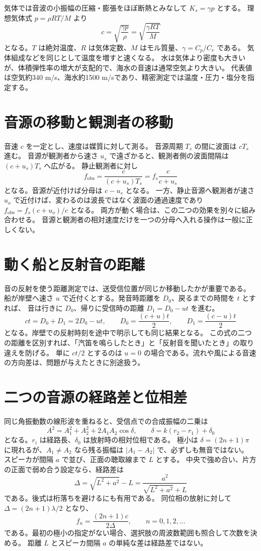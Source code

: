 気体では音波の小振幅の圧縮・膨張をほぼ断熱とみなして \(K_s=\gamma p\) とする。
理想気体式 \(p=\rho RT/M\) より
\[
 c=\sqrt{\frac{\gamma p}{\rho}}=\sqrt{\frac{\gamma RT}{M}}
\]
となる。\(T\) は絶対温度、\(R\) は気体定数、\(M\) はモル質量、\(\gamma=C_p/C_v\) である。
気体組成などを同じとして温度を増すと速くなる。
水は気体より密度も大きいが、体積弾性率の増大が支配的で、海水の音速は通常空気より大きい。
代表値は空気約340 m/s、海水約1500 m/sであり、精密測定では温度・圧力・塩分を指定する\cite{os_sound}。

\section{音源の移動と観測者の移動}\label{theory:wave:doppler}
音速 \(c\) を一定とし、速度は媒質に対して測る。
音源周期 \(T_s\) の間に波面は \(cT_s\) 進む。
音源が観測者から速さ \(u_s\) で遠ざかると、観測者側の波面間隔は \((c+u_s)T_s\) へ広がる。
静止観測者に対し
\[
 f_{\mathrm{obs}}=\frac{c}{(c+u_s)T_s}=f_s\frac{c}{c+u_s}
\]
となる。音源が近付けば分母は \(c-u_s\) となる。
一方、静止音源へ観測者が速さ \(u_o\) で近付けば、変わるのは波長ではなく波面の通過速度であり
\(f_{\mathrm{obs}}=f_s(c+u_o)/c\) となる。
両方が動く場合は、この二つの効果を別々に組み合わせる\cite{os_doppler}。
音源と観測者の相対速度だけを一つの分母へ入れる操作は一般に正しくない。

\section{動く船と反射音の距離}\label{theory:wave:echo}
音の反射を使う距離測定では、送受信位置が同じか移動したかが重要である。
船が岸壁へ速さ \(u\) で近付くとする。発音時距離を \(D_0\)、戻るまでの時間を \(t\) とすれば、
音は行きに \(D_0\)、帰りに受信時の距離 \(D_1=D_0-ut\) を進む。
\[
 ct=D_0+D_1=2D_0-ut,\qquad
 D_0=\frac{(c+u)t}{2},\qquad D_1=\frac{(c-u)t}{2}
\]
となる。岸壁での反射時刻を途中で明示しても同じ結果となる。
この式の二つの距離を区別すれば、「汽笛を鳴らしたとき」と「反射音を聞いたとき」の取り違えを防げる。
単に \(ct/2\) とするのは \(u=0\) の場合である。流れや風による音速の方向差は、問題が与えたときに別途扱う。

\section{二つの音源の経路差と位相差}\label{theory:wave:interference}
同じ角振動数の線形波を重ねると、受信点での合成振幅の二乗は
\[
 A^2=A_1^2+A_2^2+2A_1A_2\cos\delta,\qquad
 \delta=k(r_2-r_1)+\delta_0
\]
となる。\(r_i\) は経路長、\(\delta_0\) は放射時の相対位相である。
極小は \(\delta=(2n+1)\pi\) に現れるが、\(A_1\ne A_2\) なら残る振幅は \(|A_1-A_2|\) で、必ずしも無音ではない\cite{os_superposition}。
スピーカが間隔 \(a\) で並び、正面の聴取線まで \(L\) とする。
中央で強め合い、片方の正面で弱め合う設定なら、経路差は
\[
 \Delta=\sqrt{L^2+a^2}-L=\frac{a^2}{\sqrt{L^2+a^2}+L}
\]
である。後式は桁落ちを避けるにも有用である。
同位相の放射に対して \(\Delta=(2n+1)\lambda/2\) となり、
\[
 f_n=\frac{(2n+1)c}{2\Delta},\qquad n=0,1,2,\ldots
\]
である。最初の極小の指定がない場合、選択肢の周波数範囲も照合して次数を決める。
距離 \(L\) とスピーカ間隔 \(a\) の単純な差は経路差ではない。

